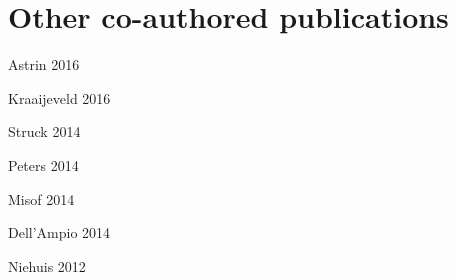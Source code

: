 \chapter{Other co-authored publications}
\label{app:other-publications}

Astrin 2016

Kraaijeveld 2016

Struck 2014

Peters 2014

Misof 2014
\label{app:Misof2014}

Dell'Ampio 2014

Niehuis 2012

